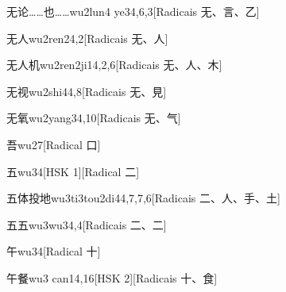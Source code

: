 \begin{entry}{无论……也……}{wu2lun4 ye3}{4,6,3}[Radicais ⽆、⾔、⼄]
\end{entry}

\begin{entry}{无人}{wu2ren2}{4,2}[Radicais ⽆、⼈]
\end{entry}

\begin{entry}{无人机}{wu2ren2ji1}{4,2,6}[Radicais ⽆、⼈、⽊]
\end{entry}

\begin{entry}{无视}{wu2shi4}{4,8}[Radicais ⽆、⾒]
\end{entry}

\begin{entry}{无氧}{wu2yang3}{4,10}[Radicais ⽆、⽓]
\end{entry}

\begin{entry}{吾}{wu2}{7}[Radical ⼝]
\end{entry}

\begin{entry}{五}{wu3}{4}[HSK 1][Radical ⼆]
\end{entry}

\begin{entry}{五体投地}{wu3ti3tou2di4}{4,7,7,6}[Radicais ⼆、⼈、⼿、⼟]
\end{entry}

\begin{entry}{五五}{wu3wu3}{4,4}[Radicais ⼆、⼆]
\end{entry}

\begin{entry}{午}{wu3}{4}[Radical ⼗]
\end{entry}

\begin{entry}{午餐}{wu3 can1}{4,16}[HSK 2][Radicais ⼗、⾷]
\end{entry}

